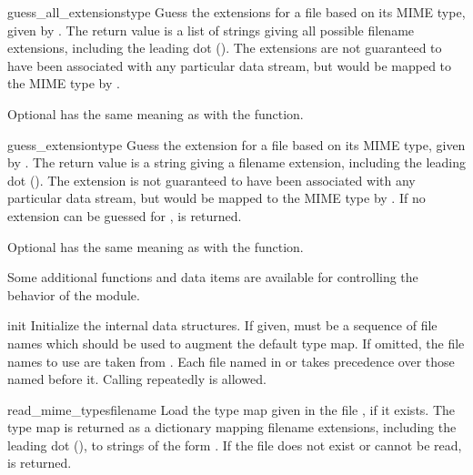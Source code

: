 \begin{funcdesc}{guess_all_extensions}{type}
Guess the extensions for a file based on its MIME type, given by
.
The return value is a list of strings giving all possible filename extensions,
including the leading dot ().  The extensions are not guaranteed
to have been associated with any particular data stream, but would be mapped
to the MIME type  by .

Optional  has the same meaning as with the
 function.
\end{funcdesc}


\begin{funcdesc}{guess_extension}{type}
Guess the extension for a file based on its MIME type, given by
.
The return value is a string giving a filename extension, including the
leading dot ().  The extension is not guaranteed to have been
associated with any particular data stream, but would be mapped to the 
MIME type  by .  If no extension can
be guessed for ,  is returned.

Optional  has the same meaning as with the
 function.
\end{funcdesc}


Some additional functions and data items are available for controlling
the behavior of the module.


\begin{funcdesc}{init}{}
Initialize the internal data structures.  If given,  must
be a sequence of file names which should be used to augment the
default type map.  If omitted, the file names to use are taken from
.  Each file named in  or
 takes precedence over those named before it.
Calling  repeatedly is allowed.
\end{funcdesc}

\begin{funcdesc}{read_mime_types}{filename}
Load the type map given in the file , if it exists.  The 
type map is returned as a dictionary mapping filename extensions,
including the leading dot (), to strings of the form
.  If the file  does
not exist or cannot be read,  is returned.
\end{funcdesc}


